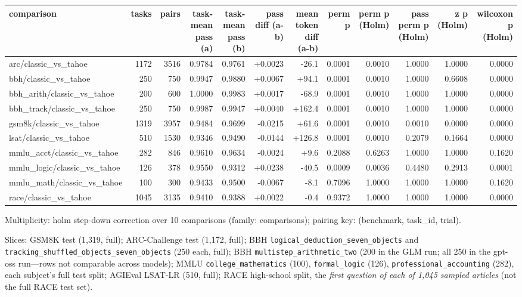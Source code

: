 \documentclass[11pt,a4paper]{article}
\begin{document}
\begin{tabular}{@{}l r r r r r r r r r r r@{}}
\toprule
comparison & tasks & pairs & task-mean pass (a) & task-mean pass (b) & pass diff (a-b) & mean token diff (a-b) & perm p & perm p (Holm) & pass perm p (Holm) & z p (Holm) & wilcoxon p (Holm) \\
\midrule
arc/classic\_vs\_tahoe & 1172 & 3516 & 0.9784 & 0.9761 & +0.0023 & -26.1 & 0.0001 & 0.0010 & 1.0000 & 1.0000 & 0.0000 \\
bbh/classic\_vs\_tahoe & 250 & 750 & 0.9947 & 0.9880 & +0.0067 & +94.1 & 0.0001 & 0.0010 & 1.0000 & 0.6608 & 0.0000 \\
bbh\_arith/classic\_vs\_tahoe & 200 & 600 & 1.0000 & 0.9983 & +0.0017 & -68.9 & 0.0001 & 0.0010 & 1.0000 & 1.0000 & 0.0000 \\
bbh\_track/classic\_vs\_tahoe & 250 & 750 & 0.9987 & 0.9947 & +0.0040 & +162.4 & 0.0001 & 0.0010 & 1.0000 & 1.0000 & 0.0000 \\
gsm8k/classic\_vs\_tahoe & 1319 & 3957 & 0.9484 & 0.9699 & -0.0215 & +61.6 & 0.0001 & 0.0010 & 0.0010 & 0.0000 & 0.0000 \\
lsat/classic\_vs\_tahoe & 510 & 1530 & 0.9346 & 0.9490 & -0.0144 & +126.8 & 0.0001 & 0.0010 & 0.2079 & 0.1664 & 0.0000 \\
mmlu\_acct/classic\_vs\_tahoe & 282 & 846 & 0.9610 & 0.9634 & -0.0024 & +9.6 & 0.2088 & 0.6263 & 1.0000 & 1.0000 & 0.1620 \\
mmlu\_logic/classic\_vs\_tahoe & 126 & 378 & 0.9550 & 0.9312 & +0.0238 & -40.5 & 0.0009 & 0.0036 & 0.4480 & 0.2913 & 0.0001 \\
mmlu\_math/classic\_vs\_tahoe & 100 & 300 & 0.9433 & 0.9500 & -0.0067 & -8.1 & 0.7096 & 1.0000 & 1.0000 & 1.0000 & 0.1620 \\
race/classic\_vs\_tahoe & 1045 & 3135 & 0.9410 & 0.9388 & +0.0022 & -0.4 & 0.9372 & 1.0000 & 1.0000 & 1.0000 & 0.0000 \\
\bottomrule
\end{tabular}

Multiplicity: holm step-down correction over 10 comparisons (family: comparisons); pairing key: (benchmark, task\_id, trial).
\endgroup

Slices: GSM8K test (1{,}319, full); ARC-Challenge test (1{,}172, full); BBH
\texttt{logical\_deduction\_seven\_objects} and
\texttt{tracking\_shuffled\_objects\_seven\_objects} (250 each, full); BBH
\texttt{multistep\_arithmetic\_two} (200 in the GLM run; all 250 in the
gpt-oss run---rows not comparable across models); MMLU
\texttt{college\_mathematics} (100), \texttt{formal\_logic} (126),
\texttt{professional\_accounting} (282), each subject's full test split;
AGIEval LSAT-LR (510, full); RACE high-school split, the \emph{first
question of each of 1{,}045 sampled articles} (not the full RACE test set).
\end{document}
